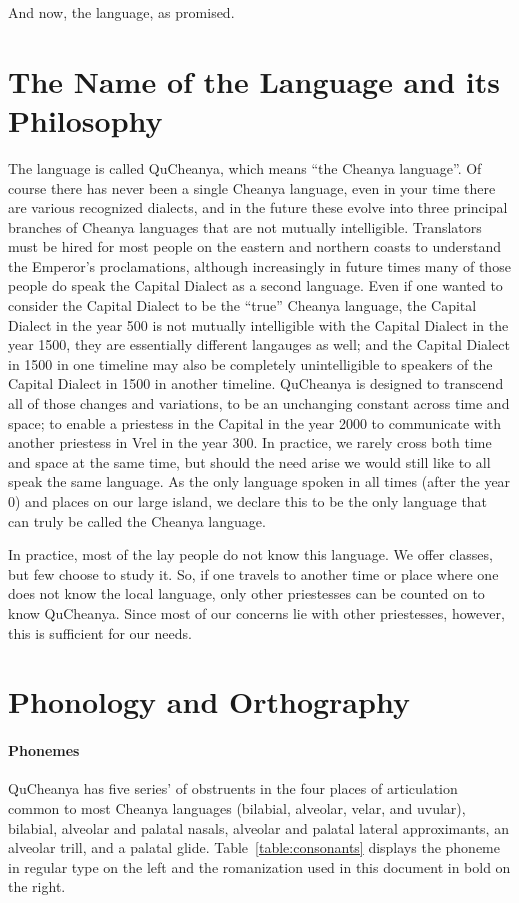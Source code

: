 \documentclass{article}
\begin{document}
And now, the language, as promised.

\newpage

\part{The Name of the Language and its Philosophy}

The language is called QuCheanya, which means ``the Cheanya language''.  Of course there has never been a single Cheanya language, even in your time there are various recognized dialects, and in the future these evolve into three principal branches of Cheanya languages that are not mutually intelligible.  Translators must be hired for most people on the eastern and northern coasts to understand the Emperor's proclamations, although increasingly in future times many of those people do speak the Capital Dialect as a second language.  Even if one wanted to consider the Capital Dialect to be the ``true'' Cheanya language, the Capital Dialect in the year 500 is not mutually intelligible with the Capital Dialect in the year 1500, they are essentially different langauges as well; and the Capital Dialect in 1500 in one timeline may also be completely unintelligible to speakers of the Capital Dialect in 1500 in another timeline. QuCheanya is designed to transcend all of those changes and variations, to be an unchanging constant across time and space; to enable a priestess in the Capital in the year 2000 to communicate with another priestess in Vrel in the year 300. In practice, we rarely cross both time and space at the same time, but should the need arise we would still like to all speak the same language. As the only language spoken in all times (after the year 0) and places on our large island, we declare this to be the only language that can truly be called the Cheanya language.

In practice, most of the lay people do not know this language. We offer classes, but few choose to study it. So, if one travels to another time or place where one does not know the local language, only other priestesses can be counted on to know QuCheanya. Since most of our concerns lie with other priestesses, however, this is sufficient for our needs.

\newpage

\part{Phonology and Orthography}
\subsection{Phonemes}
QuCheanya has five series' of obstruents in the four places of articulation common to most Cheanya languages (bilabial, alveolar, velar, and uvular), bilabial, alveolar and palatal nasals, alveolar and palatal lateral approximants, an alveolar trill, and a palatal glide.  Table~\ref{table:consonants} displays the phoneme in regular type on the left and the romanization used in this document in bold on the right.
\end{document}
